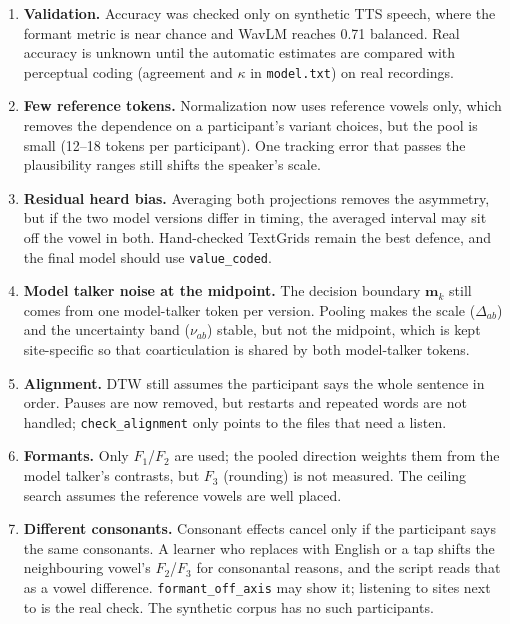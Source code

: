 \documentclass[11pt]{article}
\begin{document}
\begin{enumerate}[leftmargin=*,label=\arabic*.]
\item \textbf{Validation.} Accuracy was checked only on synthetic TTS speech, where the formant metric is near chance and WavLM reaches 0.71 balanced. Real accuracy is unknown until the automatic estimates are compared with perceptual coding (agreement and $\kappa$ in \texttt{model.txt}) on real recordings.

\item \textbf{Few reference tokens.} Normalization now uses reference vowels only, which removes the dependence on a participant's variant choices, but the pool is small (12--18 tokens per participant). One tracking error that passes the plausibility ranges still shifts the speaker's scale.

\item \textbf{Residual heard bias.} Averaging both projections removes the asymmetry, but if the two model versions differ in timing, the averaged interval may sit off the vowel in both. Hand-checked TextGrids remain the best defence, and the final model should use \texttt{value\_coded}.

\item \textbf{Model talker noise at the midpoint.} The decision boundary $\mathbf m_k$ still comes from one model-talker token per version. Pooling makes the scale ($\Delta_{ab}$) and the uncertainty band ($\nu_{ab}$) stable, but not the midpoint, which is kept site-specific so that coarticulation is shared by both model-talker tokens.

\item \textbf{Alignment.} DTW still assumes the participant says the whole sentence in order. Pauses are now removed, but restarts and repeated words are not handled; \texttt{check\_alignment} only points to the files that need a listen.

\item \textbf{Formants.} Only $F_1$/$F_2$ are used; the pooled direction weights them from the model talker's contrasts, but $F_3$ (rounding) is not measured. The ceiling search assumes the reference vowels are well placed.

\item \textbf{Different consonants.} Consonant effects cancel only if the participant says the same consonants. A learner who replaces  with English \textipa{[\*r]} or a tap shifts the neighbouring vowel's $F_2$/$F_3$ for consonantal reasons, and the script reads that as a vowel difference. \texttt{formant\_off\_axis} may show it; listening to sites next to  is the real check. The synthetic corpus has no such participants.


\end{enumerate}
\end{document}

